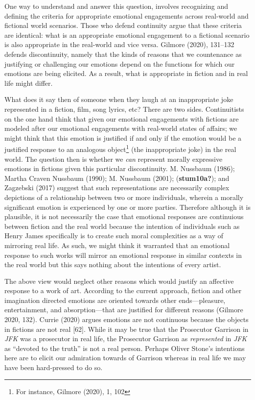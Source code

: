 \documentclass[12pt]{book}
\theoremstyle{definition}
\theoremstyle{remark}
\begin{document}
One way to understand and answer this question, involves recognizing and defining the criteria for appropriate emotional engagements across real-world and fictional world scenarios. Those who defend continuity argue that these criteria are identical: what is an appropriate emotional engagement to a fictional scenario is also appropriate in the real-world and vice versa. Gilmore (2020), 131--132 defends discontinuity, namely that the kinds of reasons that we countenance as justifying or challenging our emotions depend on the functions for which our emotions are being elicited. As a result, what is appropriate in fiction and in real life might differ.

What does it say then of someone when they laugh at an inappropriate joke represented in a fiction, film, song lyrics, etc? There are two sides. Continuitists on the one hand think that given our emotional engagements with fictions are modeled after our emotional engagements with real-world states of affairs; we might think that this emotion is justified if and only if the emotion would be a justified response to an analogous object\footnote{For instance, Gilmore (2020), 1, 102} (the inappropriate joke) in the real world. The question then is whether we \emph{can} represent morally expressive emotions in fictions given this particular discontinuity. M. Nussbaum (1986); Martha Craven Nussbaum (1990); M. Nussbaum (2001); (\textbf{stum10a?}); and Zagzebski (2017) suggest that such representations are necessarily complex depictions of a relationship between two or more individuals, wherein a morally significant emotion is experienced by one or more parties. Therefore although it is plausible, it is not necessarily the case that emotional responses are continuious between fiction and the real world because the intention of individuals such as Henry James specifically is to create such moral complexities as a way of mirroring real life. As such, we might think it warranted that an emotional response to such works will mirror an emotional response in similar contexts in the real world but this says nothing about the intentions of every artist.

The above view would neglect other reasons which would justify an affective response to a work of art. According to the current approach, fiction and other imagination directed emotions are oriented towards other ends---pleasure, entertainment, and absorption---that are justified for different reasons (Gilmore 2020, 132). Currie (2020) argues emotions are not continuous because the objects in fictions are not real {[}62{]}. While it may be true that the Prosecutor Garrison in \emph{JFK} was a prosecutor in real life, the Prosecutor Garrison as \emph{represented} in \emph{JFK} as ``devoted to the truth'' is not a real person. Perhaps Oliver Stone's intentions here are to elicit our admiration towards of Garrison whereas in real life we may have been hard-pressed to do so.
\end{document}

